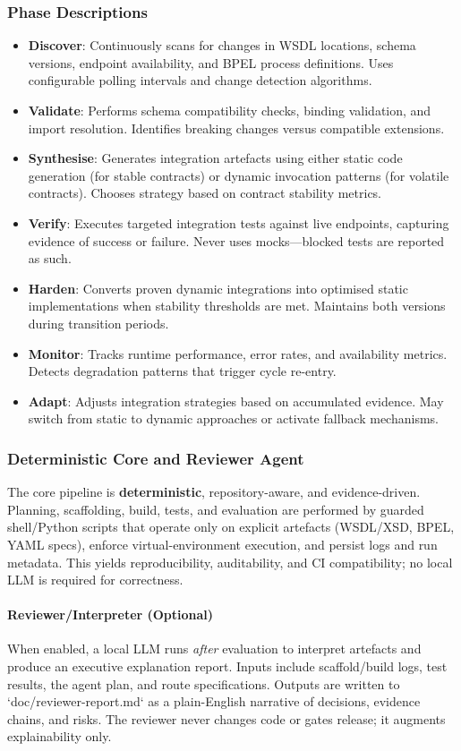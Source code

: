 \documentclass[11pt,a4paper]{article}
\begin{document}
\subsubsection{Phase Descriptions}
\begin{itemize}
\item \textbf{Discover}: Continuously scans for changes in WSDL locations, schema versions, endpoint availability, and BPEL process definitions. Uses configurable polling intervals and change detection algorithms.
\item \textbf{Validate}: Performs schema compatibility checks, binding validation, and import resolution. Identifies breaking changes versus compatible extensions.
\item \textbf{Synthesise}: Generates integration artefacts using either static code generation (for stable contracts) or dynamic invocation patterns (for volatile contracts). Chooses strategy based on contract stability metrics.
\item \textbf{Verify}: Executes targeted integration tests against live endpoints, capturing evidence of success or failure. Never uses mocks—blocked tests are reported as such.
\item \textbf{Harden}: Converts proven dynamic integrations into optimised static implementations when stability thresholds are met. Maintains both versions during transition periods.
\item \textbf{Monitor}: Tracks runtime performance, error rates, and availability metrics. Detects degradation patterns that trigger cycle re-entry.
\item \textbf{Adapt}: Adjusts integration strategies based on accumulated evidence. May switch from static to dynamic approaches or activate fallback mechanisms.
\end{itemize}

\subsubsection{Deterministic Core and Reviewer Agent}
The core pipeline is \textbf{deterministic}, repository-aware, and evidence-driven. Planning, scaffolding, build, tests, and evaluation are performed by guarded shell/Python scripts that operate only on explicit artefacts (WSDL/XSD, BPEL, YAML specs), enforce virtual-environment execution, and persist logs and run metadata. This yields reproducibility, auditability, and CI compatibility; no local LLM is required for correctness.

\paragraph{Reviewer/Interpreter (Optional)}
When enabled, a local LLM runs \textit{after} evaluation to interpret artefacts and produce an executive explanation report. Inputs include scaffold/build logs, test results, the agent plan, and route specifications. Outputs are written to `doc/reviewer-report.md` as a plain-English narrative of decisions, evidence chains, and risks. The reviewer never changes code or gates release; it augments explainability only.
\end{document}
